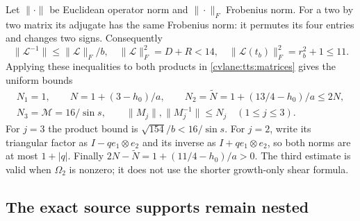 Let $\|\cdot\|$ be Euclidean operator norm and
$\|\cdot\|_F$ Frobenius norm. For a two by two matrix its
adjugate has the same Frobenius norm: it permutes its four entries
and changes two signs. Consequently
\[
 \|\mathcal L^{-1}\|\leq\|\mathcal L\|_F/b,\quad
 \|\mathcal L\|_F^2=D+R<14,\quad
 \|\mathcal L(t_b)\|_F^2=r_b^2+1\leq11.
\]
Applying these inequalities to both products in
\eqref{cvlane:tts:matrices} gives the uniform bounds
\begin{equation}\label{cvlane:tts:matrixbounds}
 \begin{gathered}
 N_1=1,\qquad N=1+(3-h_0)/a,\qquad
 N_2=\widetilde N=1+(13/4-h_0)/a\leq2N,\\
 N_3=\mathcal M=16/\sin s,\qquad
 \|M_j\|,\|M_j^{-1}\|\leq N_j\quad(1\leq j\leq3).
 \end{gathered}
\end{equation}
For $j=3$ the product bound is $\sqrt{154}/b<16/\sin s$.
For $j=2$, write its triangular factor as $I-qe_1\otimes e_2$
and its inverse as $I+qe_1\otimes e_2$, so both norms are at
most $1+|q|$. Finally
$2N-\widetilde N=1+(11/4-h_0)/a>0$.
The third estimate is valid when $\Omega_2$ is nonzero; it does
not use the shorter growth-only shear formula.

\subsection{The exact source supports remain nested}

